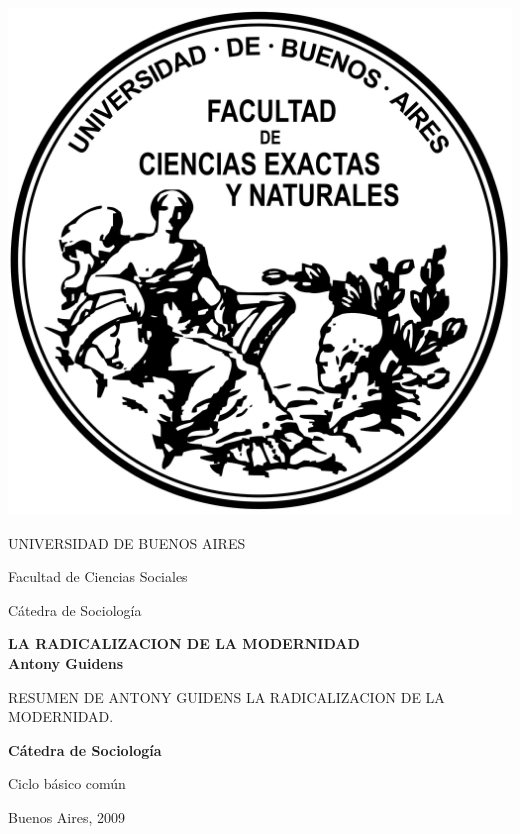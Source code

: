 \documentclass[12pt]{book}
\begin{document}
\thispagestyle{empty}

\begin {center}

\includegraphics[scale=.3]{Logo-fcenuba.png}

\medskip
UNIVERSIDAD DE BUENOS AIRES

Facultad de Ciencias Sociales

C\'atedra de Sociolog\'ia


\vspace{3cm}


\textbf{\large LA RADICALIZACION DE LA MODERNIDAD \\ Antony Guidens}

\vspace{2cm}


RESUMEN DE ANTONY GUIDENS LA RADICALIZACION DE LA MODERNIDAD.
\vspace{2cm}

\textbf{C\'atedra de Sociolog\'ia}

\end {center}


\vspace{1.5cm}

\noindent Ciclo b\'asico com\'un
 
\noindent Buenos Aires, 2009
\end{document}
